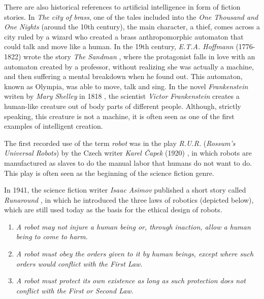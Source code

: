 There are also historical references to artificial intelligence in form of fiction stories. In \textit{The city of brass}, one of the tales included into the \textit{One Thousand and One Nights} (around the 10th century), the main character, a thief, comes across a city ruled by a wizard who created a brass anthropomorphic automaton that could talk and move like a human. In the 19th century, \textit{E.T.A. Hoffmann} (1776-1822) wrote the story \textit{The Sandman} \autocite{hoffmann1816}, where the protagonist falls in love with an automaton created by a professor, without realizing she was actually a machine, and then suffering a mental breakdown when he found out. This automaton, known as Olympia, was able to move, talk and sing. In the novel \textit{Frankenstein} writen by \textit{Mary Shelley} in 1818 \autocite{shelley1994}, the scientist \textit{Victor Frankenstein} creates a human-like creature out of body parts of different people. Although, strictly speaking, this creature is not a machine, it is often seen as one of the first examples of intelligent creation.

The first recorded use of the term \textit{robot} was in the play \textit{R.U.R.} (\textit{Rossum’s Universal Robots}) by the Czech writer \textit{Karel Čapek} (1920) \autocite{nils2009}, in which robots are manufactured as slaves to do the manual labor that humans do not want to do. This play is often seen as the beginning of the science fiction genre.

In 1941, the science fiction writer \textit{Isaac Asimov} published a short story called \textit{Runaround} \autocite{nils2009}, in which he introduced the three laws of robotics (depicted below), which are still used today as the basis for the ethical design of robots.


\begin{enumerate}

	\item \textit{A robot may not injure a human being or, through inaction, allow a human being to come to harm}.

	\item \textit{A robot must obey the orders given to it by human beings, except where such orders would conflict with the First Law}.

	\item \textit{A robot must protect its own existence as long as such protection does not conflict with the First or Second Law}.

\end{enumerate}

